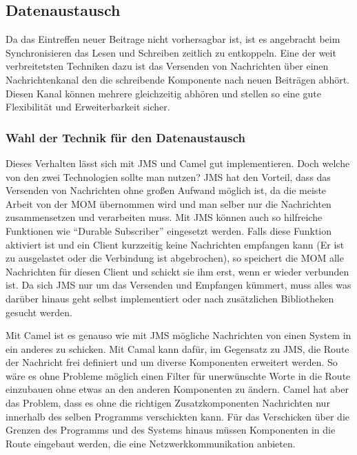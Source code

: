 

\subsection{Datenaustausch} %
\label{sub:datenaustausch}

Da das Eintreffen neuer Beitrage nicht vorhersagbar ist, ist es angebracht beim Synchronisieren das Lesen und Schreiben zeitlich zu entkoppeln. Eine der weit verbreitetsten Techniken dazu ist das Versenden von Nachrichten über einen Nachrichtenkanal den die schreibende Komponente nach neuen Beiträgen abhört. Diesen Kanal können mehrere gleichzeitig abhören und stellen so eine gute Flexibilität und Erweiterbarkeit sicher. 

\subsubsection{Wahl der Technik für den Datenaustausch} %
\label{ssub:wahl_der_technik_für_den_datenaustausch}

Dieses Verhalten lässt sich mit JMS und Camel gut implementieren. Doch welche von den zwei Technologien sollte man nutzen? JMS hat den Vorteil, dass das Versenden von Nachrichten ohne großen Aufwand möglich ist, da die meiste Arbeit von der MOM übernommen wird und man selber nur die Nachrichten zusammensetzen und verarbeiten muss. Mit JMS können auch so hilfreiche Funktionen wie \enquote{Durable Subscriber} eingesetzt werden. Falls diese Funktion aktiviert ist und ein Client kurzzeitig keine Nachrichten empfangen kann (Er ist zu ausgelastet oder die Verbindung ist abgebrochen), so speichert die MOM alle Nachrichten für diesen Client und schickt sie ihm erst, wenn er wieder verbunden ist. Da sich JMS nur um das Versenden und Empfangen kümmert, muss alles was darüber hinaus geht selbst implementiert oder nach zusätzlichen Bibliotheken gesucht werden. 

Mit Camel ist es genauso wie mit JMS mögliche Nachrichten von einen System in ein anderes zu schicken. Mit Camal kann dafür, im Gegensatz zu JMS, die Route der Nachricht frei definiert und um diverse Komponenten erweitert werden. So wäre es ohne Probleme möglich einen Filter für unerwünschte Worte in die Route einzubauen ohne etwas an den anderen Komponenten zu ändern. Camel hat aber das Problem, dass es ohne die richtigen Zusatzkomponenten Nachrichten nur innerhalb des selben Programms verschickten kann. Für das Verschicken über die Grenzen des Programms und des Systems hinaus müssen Komponenten in die Route eingebaut werden, die eine Netzwerkkommunikation anbieten. 

